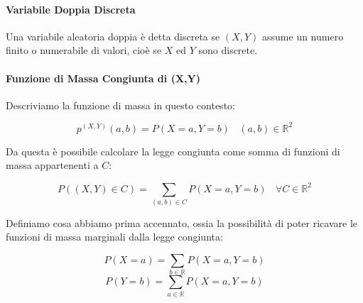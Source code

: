 \documentclass{article}
\begin{document}
\newpage

\paragraph{Variabile Doppia Discreta} Una variabile aleatoria doppia è detta discreta se $(X,Y)$ assume un numero finito o numerabile di valori, cioè se $X$ ed $Y$ sono discrete.

\paragraph{Funzione di Massa Congiunta di (X,Y)} Descriviamo la funzione di massa in questo contesto:

\[ p^{(X,Y)}(a,b) = P(X=a,Y=b) \:\:\:\: (a,b) \in \mathbb{R}^{2} \]

Da questa è possibile calcolare la legge congiunta come somma di funzioni di massa appartenenti a $C$:

\[ P((X,Y) \in C) = \sum_{(a,b) \in C} P(X=a, Y=b) \:\:\:\: \forall C \in \mathbb{R}^{2} \]

Definiamo cosa abbiamo prima accennato, ossia la possibilità di poter ricavare le funzioni di massa marginali dalla legge congiunta:

\[ P(X = a) = \sum_{b \in \mathbb{R}} P(X=a, Y=b) \]
\[ P(Y = b) = \sum_{a \in \mathbb{R}} P(X=a, Y=b) \]


\newpage
\end{document}
